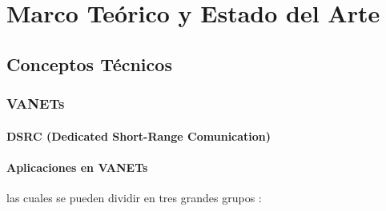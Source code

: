 \chapter{Marco Teórico y Estado del Arte}
\section{Conceptos Técnicos}

\subsection{VANETs}
\subsubsection*{DSRC (Dedicated Short-Range Comunication)}
\subsubsection{Aplicaciones en VANETs}

las cuales se pueden dividir en tres grandes grupos \cite{Bi2017}:

